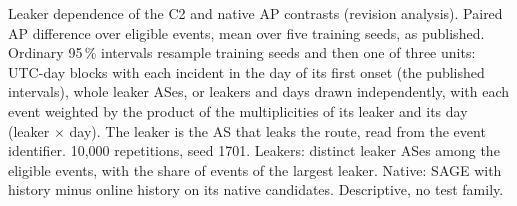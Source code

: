 \begin{table}[h]
\footnotesize
\centering
\caption{Leaker dependence of the C2 and native AP contrasts (revision analysis). Paired AP difference over eligible events, mean over five training seeds, as published. Ordinary 95\,\% intervals resample training seeds and then one of three units: UTC-day blocks with each incident in the day of its first onset (the published intervals), whole leaker ASes, or leakers and days drawn independently, with each event weighted by the product of the multiplicities of its leaker and its day (leaker $\times$ day). The leaker is the AS that leaks the route, read from the event identifier. 10,000 repetitions, seed 1701. Leakers: distinct leaker ASes among the eligible events, with the share of events of the largest leaker. Native: SAGE with history minus online history on its native candidates. Descriptive, no test family.}
\label{tab:actor-bootstrap}
\setlength{\tabcolsep}{4pt}

\end{table}

